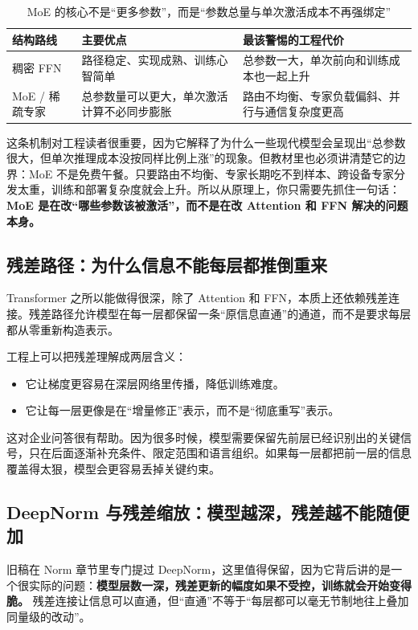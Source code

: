 \begin{table}[H]
\centering
\small
\begin{tabularx}{\textwidth}{>{\raggedright\arraybackslash}p{2.8cm}>{\raggedright\arraybackslash}p{3cm}>{\raggedright\arraybackslash}X}
\toprule
\textbf{结构路线} & \textbf{主要优点} & \textbf{最该警惕的工程代价} \\
\midrule
稠密 FFN & 路径稳定、实现成熟、训练心智简单 & 总参数一大，单次前向和训练成本也一起上升 \\
MoE / 稀疏专家 & 总参数量可以更大，单次激活计算不必同步膨胀 & 路由不均衡、专家负载偏斜、并行与通信复杂度更高 \\
\bottomrule
\end{tabularx}
\caption{MoE 的核心不是“更多参数”，而是“参数总量与单次激活成本不再强绑定”}
\label{tab:moe-intuition}
\end{table}

这条机制对工程读者很重要，因为它解释了为什么一些现代模型会呈现出“总参数很大，但单次推理成本没按同样比例上涨”的现象。但教材里也必须讲清楚它的边界：MoE 不是免费午餐。只要路由不均衡、专家长期吃不到样本、跨设备专家分发太重，训练和部署复杂度就会上升。所以从原理上，你只需要先抓住一句话：\textbf{MoE 是在改“哪些参数该被激活”，而不是在改 Attention 和 FFN 解决的问题本身。}

\subsection{残差路径：为什么信息不能每层都推倒重来}
Transformer 之所以能做得很深，除了 Attention 和 FFN，本质上还依赖残差连接。残差路径允许模型在每一层都保留一条“原信息直通”的通道，而不是要求每层都从零重新构造表示。

工程上可以把残差理解成两层含义：
\begin{itemize}
  \item 它让梯度更容易在深层网络里传播，降低训练难度。
  \item 它让每一层更像是在“增量修正”表示，而不是“彻底重写”表示。
\end{itemize}

这对企业问答很有帮助。因为很多时候，模型需要保留先前层已经识别出的关键信号，只在后面逐渐补充条件、限定范围和语言组织。如果每一层都把前一层的信息覆盖得太狠，模型会更容易丢掉关键约束。

\subsection{DeepNorm 与残差缩放：模型越深，残差越不能随便加}
旧稿在 Norm 章节里专门提过 DeepNorm，这里值得保留，因为它背后讲的是一个很实际的问题：\textbf{模型层数一深，残差更新的幅度如果不受控，训练就会开始变得脆。} 残差连接让信息可以直通，但“直通”不等于“每层都可以毫无节制地往上叠加同量级的改动”。

